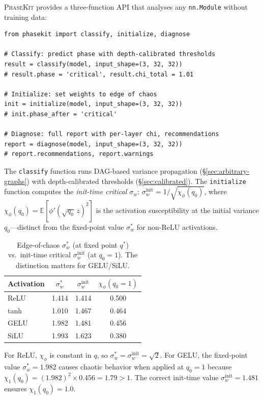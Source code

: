\documentclass[10pt]{article}
\newcommand{\EE}{\mathbb{E}}
\newcommand{\ToolName}{\textsc{PhaseKit}}
\begin{document}
\ToolName{} provides a three-function API that analyses any \texttt{nn.Module} without training data:

\begin{verbatim}
from phasekit import classify, initialize, diagnose

# Classify: predict phase with depth-calibrated thresholds
result = classify(model, input_shape=(3, 32, 32))
# result.phase = 'critical', result.chi_total = 1.01

# Initialize: set weights to edge of chaos
init = initialize(model, input_shape=(3, 32, 32))
# init.phase_after = 'critical'

# Diagnose: full report with per-layer chi, recommendations
report = diagnose(model, input_shape=(3, 32, 32))
# report.recommendations, report.warnings
\end{verbatim}

\noindent The \texttt{classify} function runs DAG-based variance propagation (\S\ref{sec:arbitrary-graphs}) with depth-calibrated thresholds (\S\ref{sec:calibrated}).
The \texttt{initialize} function computes the \emph{init-time critical $\sigma_w$}: $\sigma_w^{\text{init}} = 1/\sqrt{\chi_\phi(q_0)}$, where $\chi_\phi(q_0) = \EE[\phi'(\sqrt{q_0}\,z)^2]$ is the activation susceptibility at the initial variance $q_0$---distinct from the fixed-point value $\sigma_w^*$ for non-ReLU activations.

\begin{table}[t]
\centering
\caption{Edge-of-chaos $\sigma_w^*$ (at fixed point $q^*$) vs.\ init-time critical $\sigma_w^{\text{init}}$ (at $q_0 = 1$). The distinction matters for GELU/SiLU.}
\label{tab:init-sigma}
\small
\begin{tabular}{@{}lccc@{}}
\toprule
\textbf{Activation} & $\sigma_w^*$ & $\sigma_w^{\text{init}}$ & \textbf{$\chi_\phi(q_0\!=\!1)$} \\
\midrule
ReLU & 1.414 & 1.414 & 0.500 \\
tanh & 1.010 & 1.467 & 0.464 \\
GELU & 1.982 & 1.481 & 0.456 \\
SiLU & 1.993 & 1.623 & 0.380 \\
\bottomrule
\end{tabular}
\end{table}

For ReLU, $\chi_\phi$ is constant in $q$, so $\sigma_w^* = \sigma_w^{\text{init}} = \sqrt{2}$.
For GELU, the fixed-point value $\sigma_w^* = 1.982$ causes chaotic behavior when applied at $q_0 = 1$ because $\chi_1(q_0) = (1.982)^2 \times 0.456 = 1.79 > 1$.
The correct init-time value $\sigma_w^{\text{init}} = 1.481$ ensures $\chi_1(q_0) = 1.0$.
\end{document}

